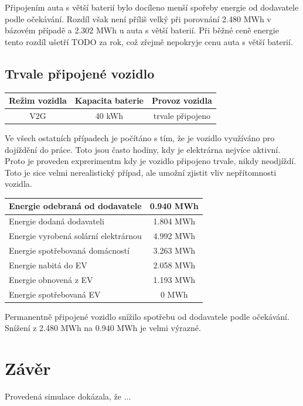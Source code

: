 \documentclass[12pt,a4paper]{Cotmas-2018}
\begin{document}
Připojením auta s větší baterií bylo docíleno menší spořeby energie od dodavatele podle očekávání.
Rozdíl však není příliš velký při porovnání 2.480 MWh v bázovém případě a
2.302 MWh u auta s větší baterií.
Při běžné ceně energie tento rozdíl ušetří TODO za rok, což zřejmě nepokryje cenu auta s větší baterií.


\subsection{Trvale připojené vozidlo}

\bigskip
\begin{tabular}{ | c | c | c | }
\hline
Režim vozidla & Kapacita baterie & Provoz vozidla \\
\hline
V2G & 40 kWh & trvale připojeno \\
\hline
\end{tabular}
\bigskip

Ve všech ostatních případech je počítáno s tím, že je vozidlo využíváno pro dojíždění do práce.
Toto jsou často hodiny, kdy je elektrárna nejvíce aktivní.
Proto je proveden exprerimentm kdy je vozidlo připojeno trvale, nikdy neodjíždí.
Toto je sice velmi nerealistický případ, ale umožní zjistit vliv nepřítomnosti vozidla.

\bigskip
\begin{tabular}{ | l | c | }
\hline
Energie odebraná od dodavatele & 0.940 MWh \\
\hline
Energie dodaná dodavateli & 1.804 MWh \\
\hline
Energie vyrobená solární elektrárnou & 4.992 MWh \\
\hline
Energie spotřebovaná domácností & 3.263 MWh \\
\hline
Energie nabitá do EV & 2.058 MWh \\
\hline
Energie obnovená z EV & 1.193 MWh \\
\hline
Energie spotřebovaná EV & 0 MWh \\
\hline
\end{tabular}
\bigskip

Permanentně připojené vozidlo snížilo spotřebu od dodavatele podle očekávání.
Snížení z 2.480 MWh na 0.940 MWh je velmi výrazné.


\section{Závěr}

Provedená simulace dokázala, že ...

\printbibliography
\end{document}
